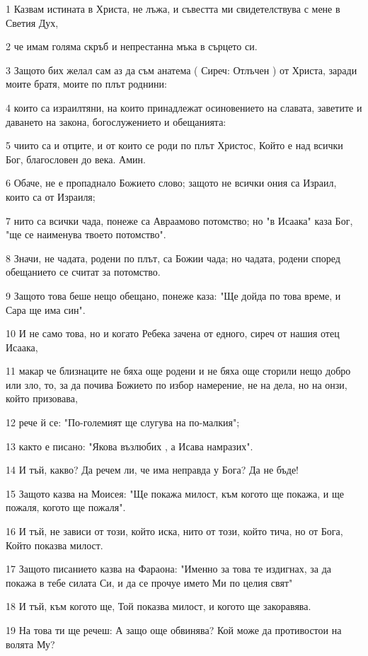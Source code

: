 \par 1 Казвам истината в Христа, не лъжа, и съвестта ми свидетелствува с мене в Светия Дух,
\par 2 че имам голяма скръб и непрестанна мъка в сърцето си.
\par 3 Защото бих желал сам аз да съм анатема ( Сиреч: Отлъчен ) от Христа, заради моите братя, моите по плът роднини:
\par 4 които са израилтяни, на които принадлежат осиновението на славата, заветите и даването на закона, богослужението и обещанията:
\par 5 чиито са и отците, и от които се роди по плът Христос, Който е над всички Бог, благословен до века. Амин.
\par 6 Обаче, не е пропаднало Божието слово; защото не всички ония са Израил, които са от Израиля;
\par 7 нито са всички чада, понеже са Авраамово потомство; но "в Исаака" каза Бог, "ще се наименува твоето потомство".
\par 8 Значи, не чадата, родени по плът, са Божии чада; но чадата, родени според обещанието се считат за потомство.
\par 9 Защото това беше нещо обещано, понеже каза: "Ще дойда по това време, и Сара ще има син".
\par 10 И не само това, но и когато Ребека зачена от едного, сиреч от нашия отец Исаака,
\par 11 макар че близнаците не бяха още родени и не бяха още сторили нещо добро или зло, то, за да почива Божието по избор намерение, не на дела, но на онзи, който призовава,
\par 12 рече й се: "По-големият ще слугува на по-малкия";
\par 13 както е писано: "Якова възлюбих , а Исава намразих".
\par 14 И тъй, какво? Да речем ли, че има неправда у Бога? Да не бъде!
\par 15 Защото казва на Моисея: "Ще покажа милост, към когото ще покажа, и ще пожаля, когото ще пожаля".
\par 16 И тъй, не зависи от този, който иска, нито от този, който тича, но от Бога, Който показва милост.
\par 17 Защото писанието казва на Фараона: "Именно за това те издигнах, за да покажа в тебе силата Си, и да се прочуе името Ми по целия свят"
\par 18 И тъй, към когото ще, Той показва милост, и когото ще закоравява.
\par 19 На това ти ще речеш: А защо още обвинява? Кой може да противостои на волята Му?
